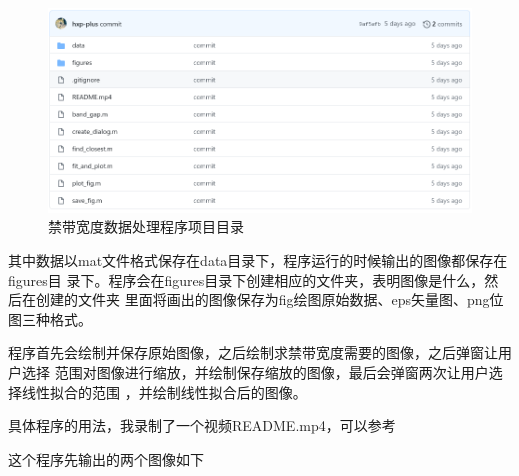 \documentclass{ctexart}
\begin{document}
\begin{figure}[H]
  \centering
  \includegraphics[width=\linewidth]{figures/禁带宽度数据处理程序}
  \caption{禁带宽度数据处理程序项目目录}
\end{figure}

其中数据以mat文件格式保存在data目录下，程序运行的时候输出的图像都保存在figures目
录下。程序会在figures目录下创建相应的文件夹，表明图像是什么，然后在创建的文件夹
里面将画出的图像保存为fig绘图原始数据、eps矢量图、png位图三种格式。

程序首先会绘制并保存原始图像，之后绘制求禁带宽度需要的图像，之后弹窗让用户选择
范围对图像进行缩放，并绘制保存缩放的图像，最后会弹窗两次让用户选择线性拟合的范围
，并绘制线性拟合后的图像。

具体程序的用法，我录制了一个视频README.mp4，可以参考

这个程序先输出的两个图像如下
\end{document}
